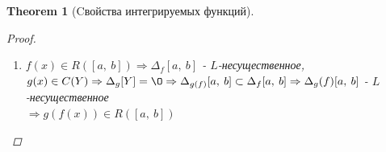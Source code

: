 \documentclass[a4paper,12pt, centered]{bookest}
\newtheorem{theorem}{Theorem}[section]
\theoremstyle{remark}
\begin{document}
\begin{theorem}[Cвойства интегрируемых функций]
\begin{proof}
\begin{enumerate}
\begin{itemize}
					\item [3.] $\Delta_{\frac fg}[a,\>b]\subset(\Delta_f[a,\>b]\cup\Delta_g[a,\>b]\Rightarrow\Delta_{\frac fg}[a,\>b]$ - $L$-несущественное\\ $\Rightarrow\frac{f(x)}{g(x)}\in r([a,\>b])$
				\end{itemize}
			\item $f(x)\in R([a,\>b])\Rightarrow\Delta_f[a,\>b]$ - $L$-несущественное, $g(x)\in C(Y)\\\Rightarrow\Delta_g [Y]=\O\Rightarrow \Delta_{g(f)}[a,\>b]\subset \Delta_f[a,\>b]\Rightarrow\Delta_g(f)[a,\>b]$ - $L$-несущественное \\$\Rightarrow g(f(x))\in R([a,\>b])$
		\end{enumerate}
	\end{proof}
\end{theorem}
\end{document}
